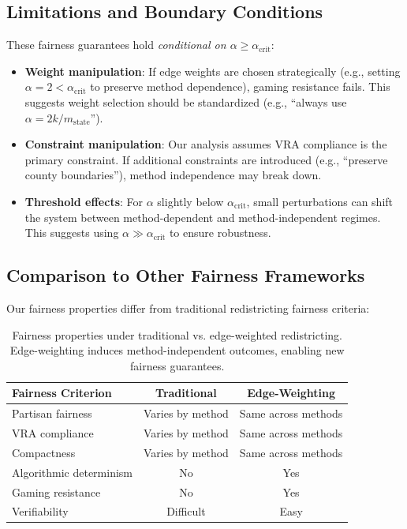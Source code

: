 \subsection{Limitations and Boundary Conditions}

These fairness guarantees hold \textit{conditional on $\alpha \geq \alpha_{\text{crit}}$}:

\begin{itemize}
    \item \textbf{Weight manipulation}: If edge weights are chosen strategically (e.g., setting $\alpha = 2 < \alpha_{\text{crit}}$ to preserve method dependence), gaming resistance fails. This suggests weight selection should be standardized (e.g., ``always use $\alpha = 2k / m_{\text{state}}$'').

    \item \textbf{Constraint manipulation}: Our analysis assumes VRA compliance is the primary constraint. If additional constraints are introduced (e.g., ``preserve county boundaries''), method independence may break down.

    \item \textbf{Threshold effects}: For $\alpha$ slightly below $\alpha_{\text{crit}}$, small perturbations can shift the system between method-dependent and method-independent regimes. This suggests using $\alpha \gg \alpha_{\text{crit}}$ to ensure robustness.
\end{itemize}

\subsection{Comparison to Other Fairness Frameworks}

Our fairness properties differ from traditional redistricting fairness criteria:

\begin{table}[h]
\centering
\begin{tabular}{lcc}
\toprule
\textbf{Fairness Criterion} & \textbf{Traditional} & \textbf{Edge-Weighting} \\
\midrule
Partisan fairness & Varies by method & Same across methods \\
VRA compliance & Varies by method & Same across methods \\
Compactness & Varies by method & Same across methods \\
Algorithmic determinism & No & Yes \\
Gaming resistance & No & Yes \\
Verifiability & Difficult & Easy \\
\bottomrule
\end{tabular}
\caption{Fairness properties under traditional vs. edge-weighted redistricting. Edge-weighting induces method-independent outcomes, enabling new fairness guarantees.}
\label{tab:fairness-comparison-supp}
\end{table}

